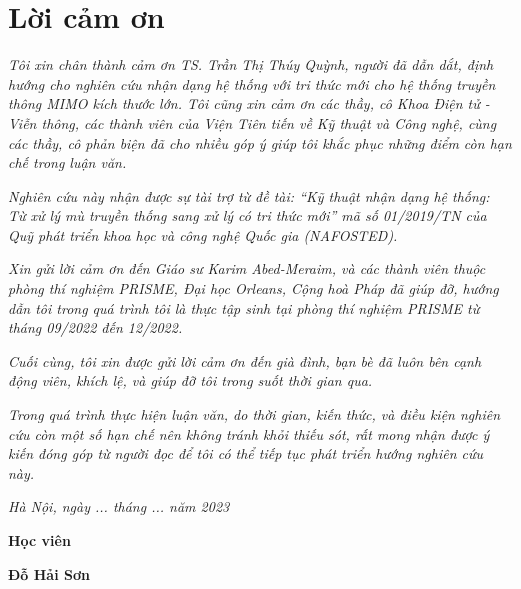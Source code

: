 \clearpage
{}

\chapter*{Lời cảm ơn}

\textit{Tôi xin chân thành cảm ơn TS. Trần Thị Thúy Quỳnh, người đã dẫn dắt, định hướng cho nghiên cứu nhận dạng hệ thống với tri thức mới cho hệ thống truyền thông MIMO kích thước lớn. Tôi cũng xin cảm ơn các thầy, cô Khoa Điện tử - Viễn thông, các thành viên của Viện Tiên tiến về Kỹ thuật và Công nghệ, cùng các thầy, cô phản biện đã cho nhiều góp ý giúp tôi khắc phục những điểm còn hạn chế trong luận văn.}

\textit{Nghiên cứu này nhận được sự tài trợ từ đề tài: ``Kỹ thuật nhận dạng hệ thống: Từ xử lý mù truyền thống sang xử lý có tri thức mới'' mã số 01/2019/TN của Quỹ phát triển khoa học và công nghệ Quốc gia (NAFOSTED).}

\textit{Xin gửi lời cảm ơn đến Giáo sư Karim Abed-Meraim, và các thành viên thuộc phòng thí nghiệm PRISME, Đại học Orleans, Cộng hoà Pháp đã giúp đỡ, hướng dẫn tôi trong quá trình tôi là thực tập sinh tại phòng thí nghiệm PRISME từ tháng 09/2022 đến 12/2022.}

\textit{Cuối cùng, tôi xin được gửi lời cảm ơn đến già đình, bạn bè đã luôn bên cạnh động viên, khích lệ, và giúp đỡ tôi trong suốt thời gian qua.}

\textit{Trong quá trình thực hiện luận văn, do thời gian, kiến thức, và điều kiện nghiên cứu còn một số hạn chế nên không tránh khỏi thiếu sót, rất mong nhận được ý kiến đóng góp từ người đọc để tôi có thể tiếp tục phát triển hướng nghiên cứu này.} 

\vspace{1cm}
\hspace{7cm}\textit{Hà Nội, ngày ... tháng ... năm 2023}

\hspace{9.4cm}\textbf{Học viên}
\vspace{2.5cm}


\hspace{9.3cm}\textbf{Đỗ Hải Sơn}